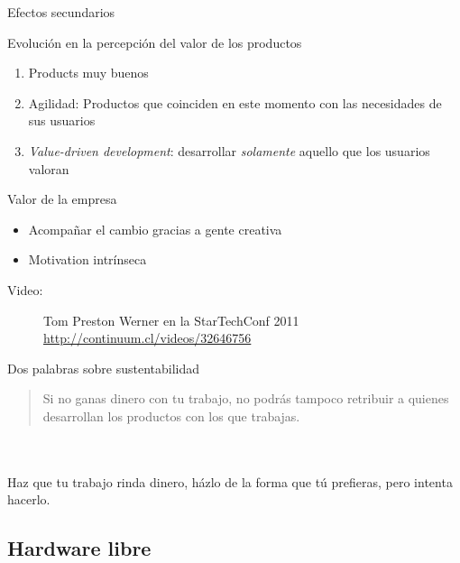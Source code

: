   \begin{frame}{Efectos secundarios}
    \begin{block}{Evolución en la percepción del valor de los productos}
      \begin{enumerate}
        \item Products muy buenos
        \item Agilidad: Productos que coinciden \alert{en este momento} con las necesidades de sus usuarios
        \item \emph{Value-driven development}: desarrollar \emph{solamente} aquello que los usuarios valoran
      \end{enumerate}
    \end{block}
    \begin{block}{Valor de la empresa}
      \begin{itemize}
        \item Acompañar el cambio gracias a gente creativa
        \item Motivation intrínseca \cite{pink2011drive}
      \end{itemize}
    \end{block}
    \begin{description}
      \item[Video:] Tom Preston Werner en la StarTechConf 2011 \url{http://continuum.cl/videos/32646756}
    \end{description}
  \end{frame}  

  \begin{frame}{Dos palabras sobre sustentabilidad}
      \hspace{.9em}\vspace{-1.4em}
      \begin{quote}
        Si no ganas dinero con tu trabajo, no podrás tampoco retribuir a quienes desarrollan los productos con los que trabajas.\hspace{.5em}
      \end{quote}\\~\\ \vfill
      Haz que tu trabajo rinda dinero, házlo de la forma que tú prefieras, pero intenta hacerlo.
  \end{frame}

%
\subsection{Hardware libre}

